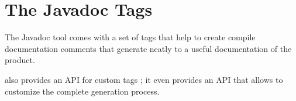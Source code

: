 \section{The Javadoc Tags}\label{sec:JavaDocTags}
The Javadoc tool comes with a set of tags that help to create compile documentation comments that generate neatly to a useful documentation of the product.

\Java also provides an API for custom tags  \autocite{ORACLE_DOC_TAGLET_INTERFACE}; it even provides an API  \autocite{ORACLE_DOC_DOCLET_PACKAGE,ORACLE_DOC_DOCLET_INTERFACE} that allows to customize the complete generation process.






